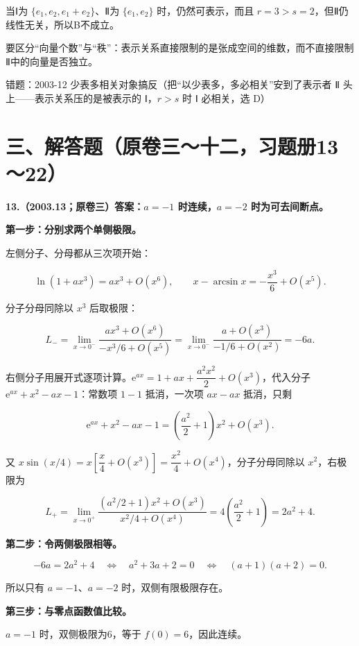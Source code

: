 \documentclass[UTF8,11pt,fontset=windows]{ctexart}
\begin{document}
当Ⅰ为 $\{e_1,e_2,e_1+e_2\}$、Ⅱ为 $\{e_1,e_2\}$ 时，仍然可表示，而且 $r=3>s=2$，但Ⅱ仍线性无关，所以B不成立。

要区分“向量个数”与“秩”：表示关系直接限制的是张成空间的维数，而不直接限制Ⅱ中的向量是否独立。

\begingroup\color{gray}错题：2003-12 少表多相关对象搞反（把“以少表多，多必相关”安到了表示者 Ⅱ 头上——表示关系压的是被表示的 Ⅰ，$r>s$ 时 Ⅰ 必相关，选 D）\par\endgroup

\clearpage

\section*{三、解答题（原卷三～十二，习题册13～22）}

\textbf{13.（2003.13；原卷三）答案：$a=-1$ 时连续，$a=-2$ 时为可去间断点。}

\textbf{第一步：分别求两个单侧极限。}

左侧分子、分母都从三次项开始：

$$
\ln(1+ax^3)=ax^3+O(x^6),
\qquad x-\arcsin x=-\frac{x^3}{6}+O(x^5).
$$

分子分母同除以 $x^3$ 后取极限：

$$
L_-=\lim_{x\to0^-}\frac{ax^3+O(x^6)}{-x^3/6+O(x^5)}
=\lim_{x\to0^-}\frac{a+O(x^3)}{-1/6+O(x^2)}
=-6a.
$$

右侧分子用展开式逐项计算。$\mathrm e^{ax}=1+ax+\dfrac{a^2x^2}{2}+O(x^3)$，代入分子 $\mathrm e^{ax}+x^2-ax-1$：常数项 $1-1$ 抵消，一次项 $ax-ax$ 抵消，只剩

$$
\mathrm e^{ax}+x^2-ax-1=\left(\frac{a^2}{2}+1\right)x^2+O(x^3).
$$

又 $x\sin(x/4)=x\left[\dfrac x4+O(x^3)\right]=\dfrac{x^2}4+O(x^4)$，分子分母同除以 $x^2$，右极限为

$$
L_+=\lim_{x\to0^+}\frac{(a^2/2+1)x^2+O(x^3)}{x^2/4+O(x^4)}
=4\left(\frac{a^2}{2}+1\right)=2a^2+4.
$$

\textbf{第二步：令两侧极限相等。}

$$
-6a=2a^2+4
\quad\Longleftrightarrow\quad
a^2+3a+2=0
\quad\Longleftrightarrow\quad
(a+1)(a+2)=0.
$$

所以只有 $a=-1$、$a=-2$ 时，双侧有限极限存在。

\textbf{第三步：与零点函数值比较。}

$a=-1$ 时，双侧极限为6，等于 $f(0)=6$，因此连续。
\end{document}
